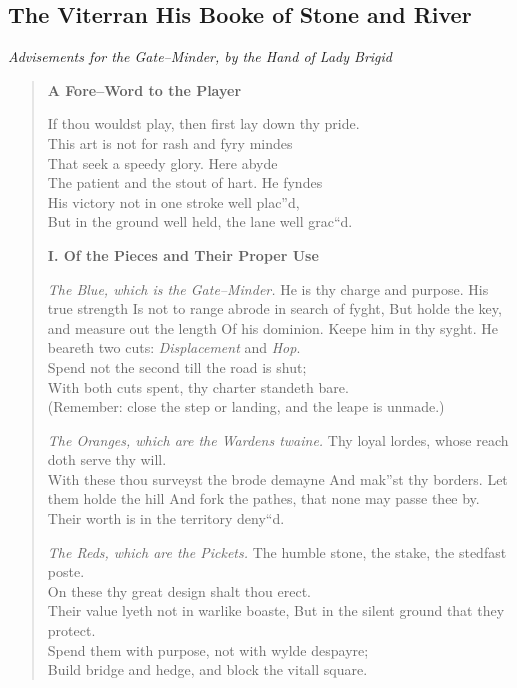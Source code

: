 \documentclass[11pt]{article}
\begin{document}
\clearpage

\subsection{The Viterran His Booke of Stone and River}
\noindent\textit{Advisements for the Gate--Minder, by the Hand of Lady Brigid}

\begin{quote}\small
\textbf{A Fore--Word to the Player}

If thou wouldst play, then first lay down thy pride.\\
This art is not for rash and fyry mindes\\
That seek a speedy glory. Here abyde\\
The patient and the stout of hart. He fyndes\\
His victory not in one stroke well plac''d,\\
But in the ground well held, the lane well grac``d.

\medskip
\textbf{I. Of the Pieces and Their Proper Use}

\textit{The Blue, which is the Gate--Minder.}
He is thy charge and purpose. His true strength
Is not to range abrode in search of fyght,
But holde the key, and measure out the length
Of his dominion. Keepe him in thy syght.
He beareth two cuts: \emph{Displacement} and \emph{Hop}.\\
Spend not the second till the road is shut;\\
With both cuts spent, thy charter standeth bare.\\
(Remember: close the step or landing, and the leape is unmade.)

\textit{The Oranges, which are the Wardens twaine.}
Thy loyal lordes, whose reach doth serve thy will.\\
With these thou surveyst the brode demayne
And mak''st thy borders. Let them holde the hill
And fork the pathes, that none may passe thee by.\\
Their worth is in the territory deny``d.

\textit{The Reds, which are the Pickets.}
The humble stone, the stake, the stedfast poste.\\
On these thy great design shalt thou erect.\\
Their value lyeth not in warlike boaste,
But in the silent ground that they protect.\\
Spend them with purpose, not with wylde despayre;\\
Build bridge and hedge, and block the vitall square.


\end{quote}
\end{document}
